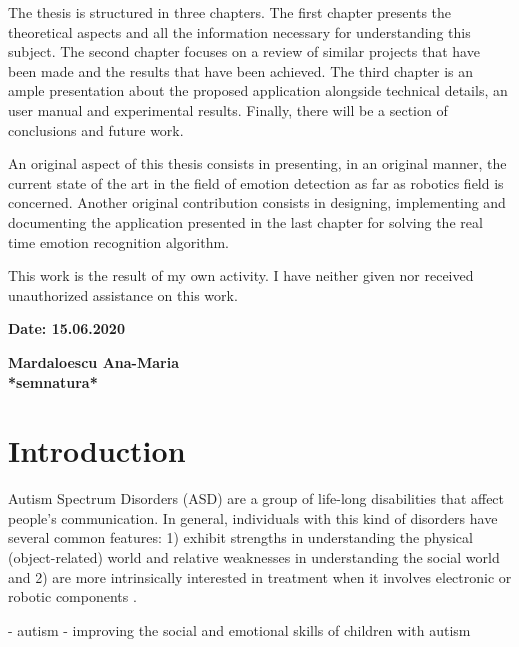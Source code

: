 \documentclass[runningheads,a4paper,12pt]{report}
\begin{document}
The thesis is structured in three chapters. The first chapter presents the theoretical aspects and all the information necessary for understanding this subject. The second chapter focuses on a review of similar projects that have been made and the results that have been achieved. The third chapter is an ample presentation about the proposed application alongside technical details, an user manual and experimental results. Finally, there will be a section of conclusions and future work.  

An original aspect of this thesis consists in presenting, in an original manner, the current state of the art in the field of emotion detection as far as robotics field is concerned. Another original contribution consists in designing, implementing and documenting the application presented in the last chapter for solving the real time emotion recognition algorithm.

This work is the result of my own activity. I have neither given nor received unauthorized assistance on this work. 

\vspace{2cm}

\begin{flushleft}
\textbf{Date: 15.06.2020}
\end{flushleft}

\begin{flushright}
\textbf{Mardaloescu Ana-Maria}\\
\textbf{*semnatura*}
\end{flushright}

\newpage

\listoffigures

\newpage

\chapter*{Introduction}
Autism Spectrum Disorders (ASD) are a group of life-long disabilities that affect people's communication.
In general, individuals with this kind of disorders have several common features: 1) exhibit strengths in understanding the physical (object-related) world and relative weaknesses in understanding the social world \cite{how-children-with-asd-behave} and 2) are more intrinsically interested in treatment when it involves electronic or robotic components \cite{android-social-skills}.

- autism - improving the social and emotional skills of children with autism
\end{document}
